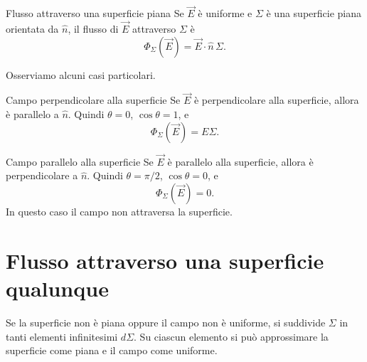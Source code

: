 \documentclass[a4paper]{article}
\begin{document}
\begin{snippetdefinition}{Flusso attraverso una superficie piana}
    Se \(\vec{E}\) è uniforme e \(\Sigma\) è una superficie piana orientata da \(\hat{n}\), il flusso di \(\vec{E}\) attraverso \(\Sigma\) è
    \[
        \Phi_\Sigma(\vec{E})=\vec{E}\cdot\hat{n}\,\Sigma.
    \]
\end{snippetdefinition}

\begin{center}
\end{center}

Osserviamo alcuni casi particolari.

\begin{snippetexample}{Campo perpendicolare alla superficie}
    Se \(\vec{E}\) è perpendicolare alla superficie, allora è parallelo a \(\hat{n}\). Quindi \(\theta=0\), \(\cos\theta=1\), e
    \[
        \Phi_\Sigma(\vec{E})=E\Sigma.
    \]
\end{snippetexample}

\begin{snippetexample}{Campo parallelo alla superficie}
    Se \(\vec{E}\) è parallelo alla superficie, allora è perpendicolare a \(\hat{n}\). Quindi \(\theta=\pi/2\), \(\cos\theta=0\), e
    \[
        \Phi_\Sigma(\vec{E})=0.
    \]
    In questo caso il campo non attraversa la superficie.
\end{snippetexample}

\section{Flusso attraverso una superficie qualunque}

Se la superficie non è piana oppure il campo non è uniforme, si suddivide \(\Sigma\) in tanti elementi infinitesimi \(d\Sigma\). Su ciascun elemento si può approssimare la superficie come piana e il campo come uniforme.
\end{document}
